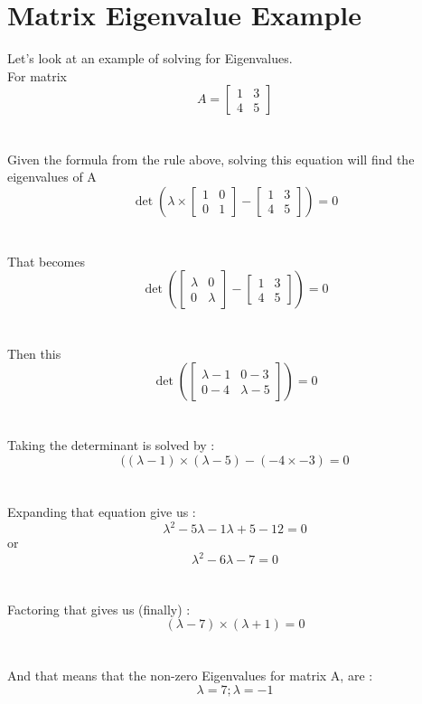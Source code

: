 \documentclass{article}
\begin{document}
\section{Matrix Eigenvalue Example}
Let's look at an example of solving for Eigenvalues.  
\\
For matrix 
\[
A = \begin{bmatrix}
    1 & 3   \\
    4 & 5      
\end{bmatrix}
\]
\\
\\
Given the formula from the rule above, solving this equation will find the eigenvalues of A
\[
\det ( \lambda \times
\begin{bmatrix}
    1 & 0   \\
    0 & 1      
\end{bmatrix}
-
\begin{bmatrix}
    1 & 3   \\
    4 & 5      
\end{bmatrix}
) = 0
\]
\\
\\
That becomes
\[
\det ( 
\begin{bmatrix}
    \lambda & 0   \\
    0 & \lambda      
\end{bmatrix}
-
\begin{bmatrix}
    1 & 3   \\
    4 & 5      
\end{bmatrix}
) = 0
\]
\\
\\
Then this
\[
\det ( 
\begin{bmatrix}
    \lambda -1 & 0 - 3   \\
    0 - 4 & \lambda - 5      
\end{bmatrix}
) = 0
\]
\\
\\
Taking the determinant is solved by :
\[
(( \lambda-1 ) \times ( \lambda - 5 ) - ( -4 \times -3 ) = 0
\]
\\
\\
Expanding that equation give us :
\[
{\lambda}^2  - 5\lambda - 1\lambda + 5  - 12 = 0
\]
or
\[
{\lambda}^2  - 6\lambda - 7 = 0
\]
\\
\\
Factoring that gives us (finally) :
\[
(\lambda - 7 )  \times (\lambda + 1 ) = 0
\]
\\
\\
And that means that the non-zero Eigenvalues for matrix A, are :
\[
\lambda = 7 ; \lambda = -1
\]
\\
\\
\end{document}
